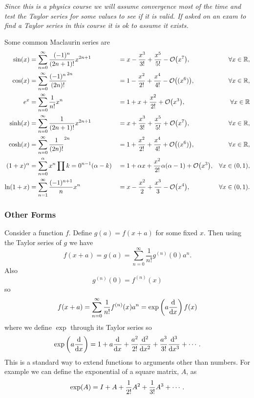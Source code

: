 \textit{
    Since this is a physics course we will assume convergence most of the time and test the Taylor series for some values to see if it is valid.
    If asked on an exam to find a Taylor series in this course it is ok to assume it exists.
}

Some common Maclaurin series are
\begin{align*}
    \sin(x) &= \sum_{n=0}^{\infty} \frac{(-1)^n}{(2n + 1)!}x^{2n+1} &&= x - \frac{x^3}{3!} + \frac{x^5}{5!} - \order{x^7}, &\forall x\in\reals,\\
    \cos(x) &= \sum_{n=0}^{\infty} \frac{(-1)^n}{(2n)!}^{2n} &&= 1 - \frac{x^2}{2!} + \frac{x^4}{4!} - \order{(x^6)}, &\forall x\in\reals,\\
    e^x &= \sum_{n=0}^{\infty} \frac{1}{n!}x^n &&= 1 + x + \frac{x^2}{2!} + \order{x^3}, &\forall x\in\reals\\
    \sinh(x) &= \sum_{n=0}^{\infty} \frac{1}{(2n + 1)!}x^{2n+1} &&= x + \frac{x^3}{3!} + \frac{x^5}{5!} + \order{x^7}, &\forall x\in\reals,\\
    \cosh(x) &= \sum_{n=0}^{\infty} \frac{1}{(2n)!}^{2n} &&= 1 + \frac{x^2}{2!} + \frac{x^4}{4!} + \order{(x^6)}, &\forall x\in\reals,\\
    (1 + x)^{\alpha} &= \sum_{n=0}^{\alpha} x^n\prod{k=0}^{n-1}(\alpha-k) &&= 1 + \alpha x + \frac{x^2}{2!}\alpha(\alpha-1) + \order{x^3}, &\forall x\in(0, 1),\\
    \ln(1 + x) &= \sum_{n=1}^{\infty}\frac{(-1)^{n+1}}{n}x^n &&= x - \frac{x^2}{2} + \frac{x^3}{3} - \order{x^4}, &\forall x\in(0, 1).
\end{align*}

\subsubsection{Other Forms}
Consider a function \(f\).
Define \(g(a) = f(x + a)\) for some fixed \(x\).
Then using the Taylor series of \(g\) we have
\[f(x + a) = g(a) = \sum_{n=0}^{\infty}\frac{1}{n!}g^{(n)}(0)a^n.\]
Also
\[g^{(n)}(0) = f^{(n)}(x)\]
so
\[f(x + a) = \sum_{n=0}^{\infty} \frac{1}{n!}f^{(n)}(x)a^n = \exp\left(a\dv{x}\right)f(x)\]
where we define \(\exp\) through its Taylor series so
\[\exp\left(a\dv{x}\right) = 1 + a\dv{x} + \frac{a^2}{2!}\dv[2]{x} + \frac{a^3}{3!}\dv[3]{x} + \dotsb.\]
This is a standard way to extend functions to arguments other than numbers.
For example we can define the exponential of a square matrix, \(A\), as
\[\exp(A) = I + A + \frac{1}{2!}A^2 + \frac{1}{3!}A^3 + \dotsb.\]


